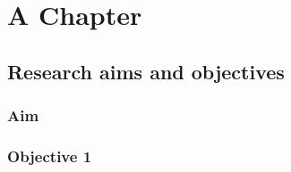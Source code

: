 \chapter{A Chapter}
\lipsum[1-3]
\section{Research aims and objectives}
\subsection{Aim}
\lipsum[2-5]
\subsection{Objective 1}
\lipsum[2-3]
